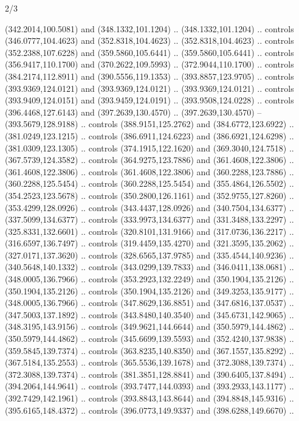 \begin{flagdescription}{2/3}
\begin{scope}[xshift=0.5\flaglength,yshift=0.5\flagwidth,scale=\flagwidth/525.28]
\begin{scope}[y=0.1mm, x=0.1mm, yscale=-1,shift={(-381.5,-404)}]
  (342.2014,100.5081) and (348.1332,101.1204) .. (348.1332,101.1204) .. controls
  (346.0777,104.4623) and (352.8318,104.4623) .. (352.8318,104.4623) .. controls
  (352.2388,107.6228) and (359.5860,105.6441) .. (359.5860,105.6441) .. controls
  (356.9417,110.1700) and (370.2622,109.5993) .. (372.9044,110.1700) .. controls
  (384.2174,112.8911) and (390.5556,119.1353) .. (393.8857,123.9705) .. controls
  (393.9369,124.0121) and (393.9369,124.0121) .. (393.9369,124.0121) .. controls
  (393.9409,124.0151) and (393.9459,124.0191) .. (393.9508,124.0228) .. controls
  (396.4468,127.6143) and (397.2639,130.4570) .. (397.2639,130.4570) --
  (393.5679,128.9188) .. controls (388.9151,125.2762) and (384.6772,123.6922) ..
  (381.0249,123.1215) .. controls (386.6911,124.6223) and (386.6921,124.6298) ..
  (381.0309,123.1305) .. controls (374.1915,122.1620) and (369.3040,124.7518) ..
  (367.5739,124.3582) .. controls (364.9275,123.7886) and (361.4608,122.3806) ..
  (361.4608,122.3806) .. controls (361.4608,122.3806) and (360.2288,123.7886) ..
  (360.2288,125.5454) .. controls (360.2288,125.5454) and (355.4864,126.5502) ..
  (354.2523,123.5678) .. controls (350.2800,126.1161) and (352.9755,127.8260) ..
  (353.4299,128.0926) .. controls (343.4437,128.0926) and (340.7504,134.6377) ..
  (337.5099,134.6377) .. controls (333.9973,134.6377) and (331.3488,133.2297) ..
  (325.8331,132.6601) .. controls (320.8101,131.9166) and (317.0736,136.2217) ..
  (316.6597,136.7497) .. controls (319.4459,135.4270) and (321.3595,135.2062) ..
  (327.0171,137.3620) .. controls (328.6565,137.9785) and (335.4544,140.9236) ..
  (340.5648,140.1332) .. controls (343.0299,139.7833) and (346.0411,138.0681) ..
  (348.0005,136.7966) .. controls (353.2923,132.2249) and (350.1904,135.2126) ..
  (350.1904,135.2126) .. controls (350.1904,135.2126) and (349.3253,135.9177) ..
  (348.0005,136.7966) .. controls (347.8629,136.8851) and (347.6816,137.0537) ..
  (347.5003,137.1892) .. controls (343.8480,140.3540) and (345.6731,142.9065) ..
  (348.3195,143.9156) .. controls (349.9621,144.6644) and (350.5979,144.4862) ..
  (350.5979,144.4862) .. controls (345.6699,139.5593) and (352.4240,137.9838) ..
  (359.5845,139.7374) .. controls (363.8235,140.8350) and (367.1557,135.8292) ..
  (367.5184,135.2553) .. controls (365.5536,139.1678) and (372.3088,139.7374) ..
  (372.3088,139.7374) .. controls (381.3851,128.8841) and (390.6405,137.8494) ..
  (394.2064,144.9641) .. controls (393.7477,144.0393) and (393.2933,143.1177) ..
  (392.7429,142.1961) .. controls (393.8843,143.8644) and (394.8848,145.9316) ..
  (395.6165,148.4372) .. controls (396.0773,149.9337) and (398.6288,149.6670) ..

\end{scope}
\end{scope}
\end{flagdescription}
